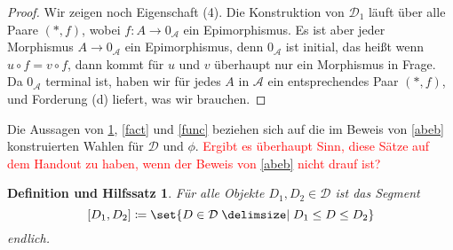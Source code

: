 \documentclass[a4paper, parskip=half]{scrartcl}
\theoremstyle{marginbreak}
\newtheorem{defle}[remark]{Definition und Hilfssatz}
\theoremstyle{nonumberplain}
\newtheorem{proof}{Beweis.}
\newcommand\cat\mathcal
\newcommand{\p}[1]{\iftoggle{proofs}{#1}{}}
\begin{document}
{\begin{proof}
			Wir zeigen noch Eigenschaft (4). Die Konstruktion von $\cat{D}_1$ läuft
			über alle Paare $(*, f)$, wobei $f\colon A\to 0_\cat{A}$ ein Epimorphismus.
			Es ist aber jeder Morphismus $A\to 0_\cat{A}$ ein Epimorphismus, denn
			$0_\cat{A}$ ist initial, das heißt wenn $u\circ f=v\circ f$, dann kommt für $u$ und $v$
			überhaupt nur ein Morphismus in Frage. Da $0_\cat{A}$ terminal ist,
			haben wir für jedes $A$ in $\cat{A}$ ein entsprechendes Paar $(*, f)$,
			und Forderung (d) liefert, was wir brauchen.
		\end{proof}}

		Die Aussagen von \ref{fin}, \ref{fact} und \ref{func} beziehen sich auf
		die im Beweis von \ref{abeb} konstruierten
		Wahlen für $\cat{D}$ und $\phi$. \textcolor{red}{Ergibt es überhaupt Sinn,
		diese Sätze auf dem Handout zu haben, wenn der Beweis von \ref{abeb}
		nicht drauf ist?}
		\begin{defle}\label{fin}
			Für alle Objekte $D_1,D_2\in\cat{D}$ ist das Segment
				\[
					[D_1, D_2] \coloneqq\set{D\in\cat{D}\given D_1\leq D\leq D_2}
				\]
			endlich.
		\end{defle}
		\p{\begin{proof}
			Wir spielen die beiden verschachtelten Induktionen noch einmal durch und
			zeigen für zwei Elemente $D_1, D_2$, die an einer Stelle der Konstruktion
			zusammen auftauchen:
			\begin{enumerate}[label=(\arabic*),noitemsep]
				\item $[D_1, D_2]$ ist endlich,
				\item $[D_1, D_2]$ wird sich in keinem weiteren Schritt noch
					verändern.
			\end{enumerate}
			$\cat{D}_0 = \set{*}$ erfüllt (1). Falls $\cat{D}_n^\alpha$ die Bedingungen
			erfüllt, betrachte $D_1, D_2$ in $\cat{D}_n^{\alpha+1}$. Die Konstruktion
			von $\cat{D}_n^{\alpha+1}$ stellt sicher, dass $D'\leq D^*$ für ein Element
			$D'$ in $\cat{D}_n^\alpha$ und ein Element $D^*$, das in $\cat{D}_n^\alpha$
			neu dazukommt, nicht vorkommen kann.

			Es seien $D_1, D_2\in\cat{D}_n^{\alpha+1}$, $D_1\leq D_2$.
			Falls $D_1, D_2\in\cat{D}_n^\alpha$,
			so ist $[D_1, D_2]$ in $\cat{D}_n^{\alpha+1}$ unverändert gegenüber
			$\cat{D}_n^{\alpha}$. Falls $D_1, D_2\notin\cat{D}_n^{\alpha}$,
			dann existieren $D, D'\in\cat{D}_n^\alpha$ mit $D_1=D^*, D_2=D'^*$.
			$[D_1,D_2]$ in $\cat{D}_n^{\alpha+1}$ ist dann isomorph zu $[D, D']$
			in $\cat{D}_n^\alpha$, also nach Voraussetzung endlich.
			Falls $D_1\notin\cat{D}_n^\alpha$, $D_2\in\cat{D}_n^\alpha$, dann ist
			$D_1=D^*$ und $[D_1, D_2] = [D^*, D_2^*]\cup[D, D_2]$, also endlich.
			$D_1\in\cat{D}_n^\alpha$, $D_2\notin\cat{D}_n^\alpha$ kann nicht eintreten.

			Da die Bedingungen bei jedem Successor-Ordinal erhalten bleiben, bleiben
			sie auch bei einem Limit-Ordinal erhalten (der Limit-Schritt fügt ja gar
			keine Objekte hinzu).
		\end{proof}}
\end{document}
